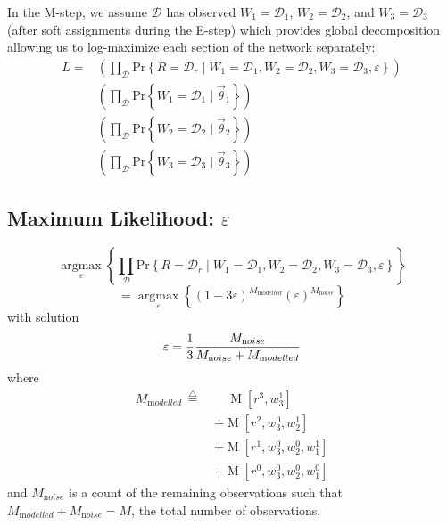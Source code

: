 \documentclass[10pt,twocolumn]{article}
\newcommand{\argmax}[2]{\ensuremath{   \underset{#1}{\operatorname{argmax}} \left\{ #2 \right\}  }}
\newcommand{\prb}[1]{\ensuremath{  \mathrm{Pr}\left\{ #1 \right\}  }}
\newcommand{\tridefeq}{\ensuremath{  \,{\overset{\triangle}{=}}\;   }}
\begin{document}
In the M-step, we assume $\mathcal{D}$ has observed $W_1 = \mathcal{D}_1$, $W_2= \mathcal{D}_2$, and $W_3= \mathcal{D}_3$ (after soft assignments during the E-step)
which provides global decomposition allowing us to log-maximize each section of the network separately:
\begin{align*}
L = & \left( \prod_{\mathcal{D}} \prb{R = \mathcal{D}_r \mid W_1 = \mathcal{D}_1, W_2 = \mathcal{D}_2, W_3 = \mathcal{D}_3, \varepsilon} \right)
\\ & \left( \prod_{\mathcal{D}} \prb{W_1 = \mathcal{D}_1 \mid \vec \theta_1} \right)
\\ & \left( \prod_{\mathcal{D}} \prb{W_2 = \mathcal{D}_2 \mid \vec \theta_2} \right)
\\ & \left( \prod_{\mathcal{D}} \prb{W_3 = \mathcal{D}_3 \mid \vec \theta_3} \right)
\end{align*}%


\subsection{Maximum Likelihood: $\varepsilon$}
\[
\argmax{\varepsilon}{ \prod_{\mathcal{D}} \prb{R = \mathcal{D}_r \mid W_1 = \mathcal{D}_1, W_2 = \mathcal{D}_2, W_3 = \mathcal{D}_3, \varepsilon}  }
\]%
\[
= \argmax{\varepsilon}{ \left(1-3\varepsilon\right)^{M_{\mathrm modelled}} \left(\varepsilon\right)^{M_{\mathrm noise}} }
\]%
with solution
\[
\varepsilon = {1 \over 3} \frac{M_{\mathrm noise}}{M_{\mathrm noise} + M_{\mathrm modelled}}
\]%
where
\begin{align*}
 M_{\mathrm modelled} \tridefeq
   &\quad \operatorname{M}\left[ r^3, w_3^1 \right]
\\ &+ \operatorname{M}\left[ r^2, w_3^0, w_2^1 \right]
\\ &+ \operatorname{M}\left[ r^1, w_3^0, w_2^0, w_1^1 \right]
\\ &+ \operatorname{M}\left[ r^0, w_3^0, w_2^0, w_1^0 \right]
\end{align*}%
and $ M_{\mathrm noise}$ is a count of the remaining observations such that $M_{\mathrm modelled} + M_{\mathrm noise} = M$, the total number of observations.
\end{document}
